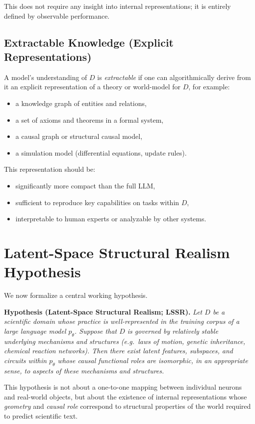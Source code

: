 \documentclass[11pt]{article}
\begin{document}
	This does not require any insight into internal representations; it is entirely defined by observable performance.
	
	\subsection{Extractable Knowledge (Explicit Representations)}
	
	A model's understanding of $D$ is \emph{extractable} if one can algorithmically derive from it an explicit representation of a theory or world-model for $D$, for example:
	\begin{itemize}[nosep]
		\item a knowledge graph of entities and relations,
		\item a set of axioms and theorems in a formal system,
		\item a causal graph or structural causal model,
		\item a simulation model (differential equations, update rules).
	\end{itemize}
	This representation should be:
	\begin{itemize}[nosep]
		\item significantly more compact than the full LLM,
		\item sufficient to reproduce key capabilities on tasks within $D$,
		\item interpretable to human experts or analyzable by other systems.
	\end{itemize}
	
	\section{Latent-Space Structural Realism Hypothesis}
	
	We now formalize a central working hypothesis.
	
	\medskip\noindent
	\textbf{Hypothesis (Latent-Space Structural Realism; LSSR).}
	\emph{
		Let $D$ be a scientific domain whose practice is well-represented in the training corpus of a large language model $p_\theta$. Suppose that $D$ is governed by relatively stable underlying mechanisms and structures (e.g.\ laws of motion, genetic inheritance, chemical reaction networks). Then there exist latent features, subspaces, and circuits within $p_\theta$ whose causal functional roles are isomorphic, in an appropriate sense, to aspects of these mechanisms and structures.
	}
	
	This hypothesis is not about a one-to-one mapping between individual neurons and real-world objects, but about the existence of internal representations whose \emph{geometry} and \emph{causal role} correspond to structural properties of the world required to predict scientific text.
	
\end{document}
